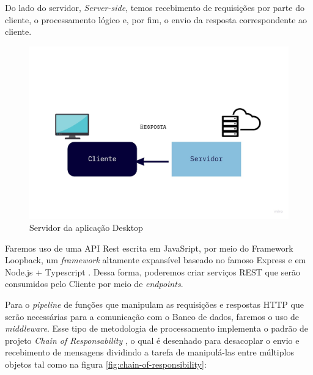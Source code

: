 
Do lado do servidor, \textit{Server-side}, temos recebimento de requisições por parte do cliente, o processamento lógico e, por fim, o envio da resposta correspondente ao cliente. 

\begin{figure}[!h]
	\centering
		\includegraphics[keepaspectratio=true,scale=0.3]{figuras/server.jpg}
	\caption{Servidor da aplicação Desktop}
	\label{fig:client-side}
\end{figure}

Faremos uso de uma API Rest escrita em JavaSript, por meio do Framework Loopback, um \textit{framework} altamente expansível baseado no famoso Express e em Node.js + Typescript \cite{Loopback}. Dessa forma, poderemos criar serviços REST que serão consumidos pelo Cliente por meio de \textit{endpoints}.

Para o \textit{pipeline} de funções que manipulam as requisições e respostas HTTP que serão necessárias para a comunicação com o Banco de dados, faremos o uso de \textit{middleware}. Esse tipo de metodologia de processamento implementa o padrão de projeto \textit{Chain of Responsability}  \cite{Chain}, o qual é desenhado para desacoplar o envio e recebimento de mensagens dividindo a tarefa de manipulá-las entre múltiplos objetos tal como na figura \ref{fig:chain-of-responsibility}:

